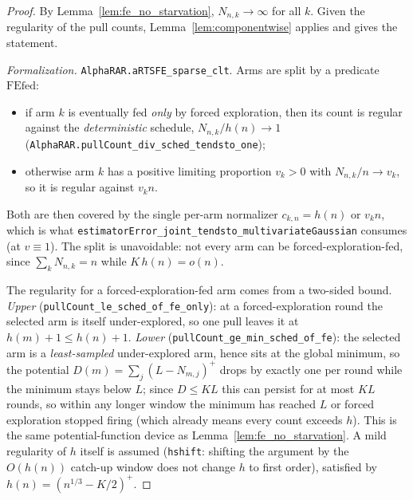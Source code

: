 \begin{proof}\leanok
{}
By Lemma~\ref{lem:fe_no_starvation}, $N_{n,k}\to\infty$ for all $k$. Given the regularity of the
pull counts, Lemma~\ref{lem:componentwise} applies and gives the statement.

\emph{Formalization.} \texttt{AlphaRAR.aRTSFE\_sparse\_clt}. Arms are split by a predicate
$\mathrm{FEfed}$:
\begin{itemize}
  \item if arm $k$ is eventually fed \emph{only} by forced exploration, then its count is regular
    against the \emph{deterministic} schedule, $N_{n,k}/h(n)\to1$
    (\texttt{AlphaRAR.pullCount\_div\_sched\_tendsto\_one});
  \item otherwise arm $k$ has a positive limiting proportion $v_k>0$ with $N_{n,k}/n\to v_k$, so it
    is regular against $v_kn$.
\end{itemize}
Both are then covered by the single per-arm normalizer $c_{k,n}=h(n)$ or $v_kn$, which is what
\texttt{estimatorError\_joint\_tendsto\_multivariateGaussian} consumes (at $v\equiv1$). The split is
unavoidable: not every arm can be forced-exploration-fed, since $\sum_kN_{n,k}=n$ while
$K\,h(n)=o(n)$.

The regularity for a forced-exploration-fed arm comes from a two-sided bound. \emph{Upper}
(\texttt{pullCount\_le\_sched\_of\_fe\_only}): at a forced-exploration round the selected arm is
itself under-explored, so one pull leaves it at $h(m)+1\le h(n)+1$. \emph{Lower}
(\texttt{pullCount\_ge\_min\_sched\_of\_fe}): the selected arm is a \emph{least-sampled}
under-explored arm, hence sits at the global minimum, so the potential
$D(m)=\sum_j(L-N_{m,j})^+$ drops by exactly one per round while the minimum stays below $L$; since
$D\le K L$ this can persist for at most $KL$ rounds, so within any longer window the minimum has
reached $L$ or forced exploration stopped firing (which already means every count exceeds $h$). This
is the same potential-function device as Lemma~\ref{lem:fe_no_starvation}. A mild regularity of $h$
itself is assumed (\texttt{hshift}: shifting the argument by the $O(h(n))$ catch-up window does not
change $h$ to first order), satisfied by $h(n)=(n^{1/3}-K/2)^+$.
\end{proof}

